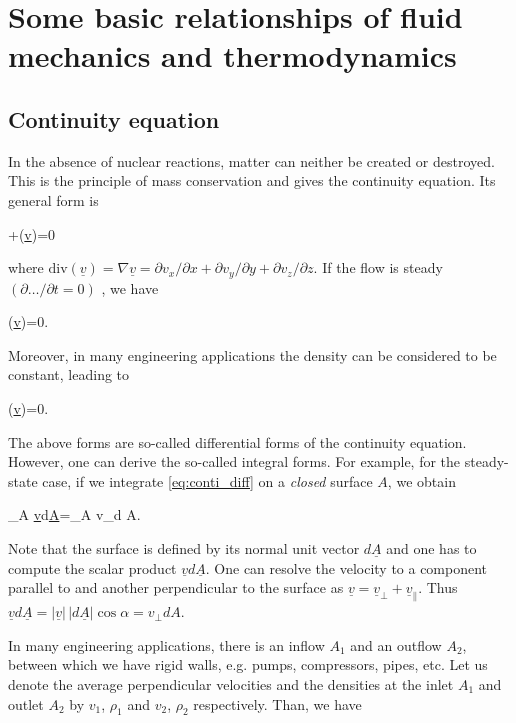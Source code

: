 \chapter{Some basic relationships of fluid mechanics and thermodynamics}

\section{Continuity equation}

In the absence of nuclear reactions, matter can neither be created or destroyed. This is the principle of mass conservation and gives the continuity equation. Its general form is

\beq
{}+(\rho \underline{v})=0
\eeq

where $\text{div}(\underline{v})=\nabla \underline{v}=\partial v_x/\partial x+\partial v_y/\partial y+\partial v_z/\partial z$. If the flow is steady $(\partial\ldots/\partial t=0)$  , we have

\beq
{}(\rho \underline{v})=0.
\eeq

Moreover, in many engineering applications the density can be considered to be constant, leading to

\beq
{}(\underline{v})=0.
\label{eq:conti_diff}
\eeq

The above forms are so-called differential forms of the continuity equation. However, one can derive the so-called integral forms. For example, for the steady-state case, if we integrate \eqref{eq:conti_diff} on a \emph{closed} surface $A$, we obtain

\beq
\int_A \rho\underline{v}d\underline{A}=\int_A \rho v_\bot d A.
\eeq

Note that the surface is defined by its normal unit vector $d\underline{A}$ and one has to compute the scalar product $\underline{v}d\underline{A}$. One can resolve the velocity to a component parallel to and another perpendicular to the surface as $\underline{v}=\underline{v}_\bot+\underline{v}_{\|}$. Thus $\underline{v}d\underline{A}=\left|\underline{v} \right| \, \left| d\underline{A}\right| \cos \alpha = v_\bot d A $.

In many engineering applications, there is an inflow $A_1$ and an outflow $A_2$, between which we have rigid walls, e.g. pumps, compressors, pipes, etc. Let us denote the average perpendicular velocities and the densities at the inlet $A_1$ and outlet $A_2$ by $v_1$, $\rho_1$ and $v_2$, $\rho_2$ respectively. Than, we have

